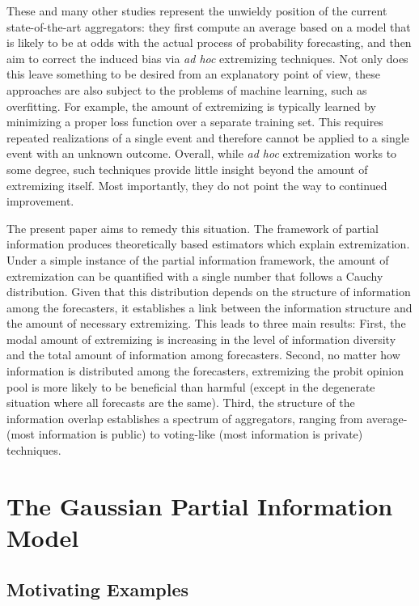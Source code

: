 \documentclass[11pt]{article}
\theoremstyle{definition}
\theoremstyle{definition}
\begin{document}
These and many other studies represent the unwieldy position of the
 current state-of-the-art aggregators: they first compute an average 
 based on a model that is
likely to be at odds with the actual process of probability
forecasting, and  then aim to correct the induced bias  via {\em ad hoc}
extremizing techniques.
%
Not only does this leave something to be desired from an explanatory
point of view, these approaches are also subject to the problems of
machine learning, such as overfitting.  For example, the amount of 
extremizing is typically learned by minimizing a
proper loss function over a separate training set. This requires repeated realizations
of a single event and therefore cannot be applied to a single event with an unknown outcome. Overall, while {\em ad hoc}
extremization works to some degree, such techniques provide little
insight beyond the amount of extremizing itself. Most importantly, they do not point
the way to continued improvement.

The present paper aims to remedy this situation.  The framework of
partial information produces theoretically based estimators which
explain extremization. Under a simple instance of the partial
information framework, the amount of extremization can be quantified
with a single number that follows a Cauchy distribution.  Given that
this distribution depends on the structure of information among the
forecasters, it establishes a link between the information structure
and the amount of necessary extremizing.  This leads to three main results:  First, the modal
amount of extremizing is increasing in the level of information
diversity and the total amount of information among forecasters.
Second, no matter how information is distributed among the forecasters,
extremizing the probit opinion pool is more likely to be beneficial
than harmful (except in the degenerate situation where all forecasts
are the same). Third, the structure of the information overlap establishes a spectrum of aggregators, ranging from
average- (most information is public) to voting-like (most information
is private) techniques.


\section{The Gaussian Partial Information Model}
\label{sec:model}

\subsection{Motivating Examples}
\end{document}
